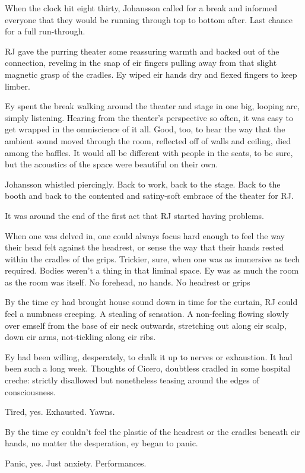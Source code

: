 When the clock hit eight thirty, Johansson called for a break and informed everyone that they would be running through top to bottom after. Last chance for a full run-through.

RJ gave the purring theater some reassuring warmth and backed out of the connection, reveling in the snap of eir fingers pulling away from that slight magnetic grasp of the cradles. Ey wiped eir hands dry and flexed fingers to keep limber.

Ey spent the break walking around the theater and stage in one big, looping arc, simply listening. Hearing from the theater's perspective so often, it was easy to get wrapped in the omniscience of it all. Good, too, to hear the way that the ambient sound moved through the room, reflected off of walls and ceiling, died among the baffles. It would all be different with people in the seats, to be sure, but the acoustics of the space were beautiful on their own.

Johansson whistled piercingly. Back to work, back to the stage. Back to the booth and back to the contented and satiny-soft embrace of the theater for RJ.

It was around the end of the first act that RJ started having problems.

When one was delved in, one could always focus hard enough to feel the way their head felt against the headrest, or sense the way that their hands rested within the cradles of the grips. Trickier, sure, when one was as immersive as tech required. Bodies weren't a thing in that liminal space. Ey was as much the room as the room was itself. No forehead, no hands. No headrest or grips

By the time ey had brought house sound down in time for the curtain, RJ could feel a numbness creeping. A stealing of sensation. A non-feeling flowing slowly over emself from the base of eir neck outwards, stretching out along eir scalp, down eir arms, not-tickling along eir ribs.

Ey had been willing, desperately, to chalk it up to nerves or exhaustion. It had been such a long week. Thoughts of Cicero, doubtless cradled in some hospital creche: strictly disallowed but nonetheless teasing around the edges of consciousness.

Tired, yes. Exhausted. Yawns.

By the time ey couldn't feel the plastic of the headrest or the cradles beneath eir hands, no matter the desperation, ey began to panic.

Panic, yes. Just anxiety. Performances.

